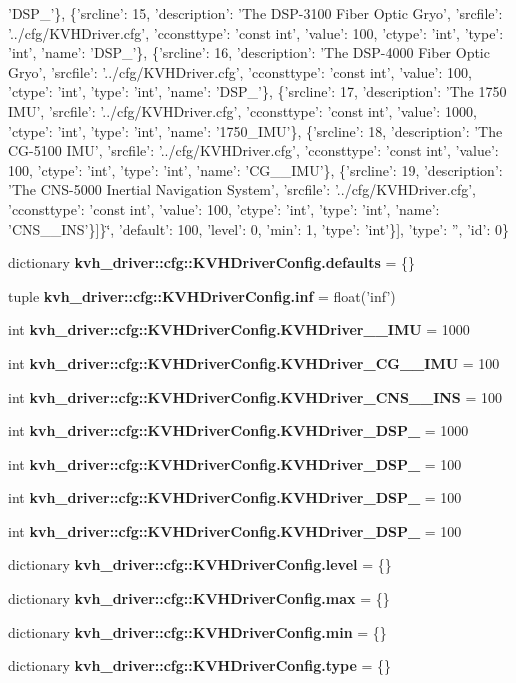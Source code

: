 \begin{DoxyCompactItemize}
'\-D\-S\-P\-\_'\}, \{'srcline'\-: 15, 'description'\-: '\-The \-D\-S\-P-\/3100 \-Fiber \-Optic \-Gryo', 'srcfile'\-: '../cfg/\-K\-V\-H\-Driver.\-cfg', 'cconsttype'\-: 'const int', 'value'\-: 100, 'ctype'\-: 'int', 'type'\-: 'int', 'name'\-: '\-D\-S\-P\-\_'\}, \{'srcline'\-: 16, 'description'\-: '\-The \-D\-S\-P-\/4000 \-Fiber \-Optic \-Gryo', 'srcfile'\-: '../cfg/\-K\-V\-H\-Driver.\-cfg', 'cconsttype'\-: 'const int', 'value'\-: 100, 'ctype'\-: 'int', 'type'\-: 'int', 'name'\-: '\-D\-S\-P\-\_'\}, \{'srcline'\-: 17, 'description'\-: '\-The 1750 \-I\-M\-U', 'srcfile'\-: '../cfg/\-K\-V\-H\-Driver.\-cfg', 'cconsttype'\-: 'const int', 'value'\-: 1000, 'ctype'\-: 'int', 'type'\-: 'int', 'name'\-: '1750\-\_\-\-I\-M\-U'\}, \{'srcline'\-: 18, 'description'\-: '\-The C\-G-\/5100 I\-M\-U', 'srcfile'\-: '../cfg/\-K\-V\-H\-Driver.\-cfg', 'cconsttype'\-: 'const int', 'value'\-: 100, 'ctype'\-: 'int', 'type'\-: 'int', 'name'\-: '\-C\-G\-\_\-\_\-\-I\-M\-U'\}, \{'srcline'\-: 19, 'description'\-: '\-The C\-N\-S-\/5000 Inertial Navigation System', 'srcfile'\-: '../cfg/\-K\-V\-H\-Driver.\-cfg', 'cconsttype'\-: 'const int', 'value'\-: 100, 'ctype'\-: 'int', 'type'\-: 'int', 'name'\-: '\-C\-N\-S\-\_\-\_\-\-I\-N\-S'\}]\}\char`\"{}, 'default'\-: 100, 'level'\-: 0, 'min'\-: 1, 'type'\-: 'int'\}], 'type'\-: '', 'id'\-: 0\}
\item 
dictionary {\bf kvh\-\_\-driver\-::cfg\-::\-K\-V\-H\-Driver\-Config.\-defaults} = \{\}
\item 
tuple {\bf kvh\-\_\-driver\-::cfg\-::\-K\-V\-H\-Driver\-Config.\-inf} = float('inf')
\item 
int {\bf kvh\-\_\-driver\-::cfg\-::\-K\-V\-H\-Driver\-Config.\-K\-V\-H\-Driver\-\_\-\_\-\-I\-M\-U} = 1000
\item 
int {\bf kvh\-\_\-driver\-::cfg\-::\-K\-V\-H\-Driver\-Config.\-K\-V\-H\-Driver\-\_\-\-C\-G\-\_\-\_\-\-I\-M\-U} = 100
\item 
int {\bf kvh\-\_\-driver\-::cfg\-::\-K\-V\-H\-Driver\-Config.\-K\-V\-H\-Driver\-\_\-\-C\-N\-S\-\_\-\_\-\-I\-N\-S} = 100
\item 
int {\bf kvh\-\_\-driver\-::cfg\-::\-K\-V\-H\-Driver\-Config.\-K\-V\-H\-Driver\-\_\-\-D\-S\-P\-\_} = 1000
\item 
int {\bf kvh\-\_\-driver\-::cfg\-::\-K\-V\-H\-Driver\-Config.\-K\-V\-H\-Driver\-\_\-\-D\-S\-P\-\_} = 100
\item 
int {\bf kvh\-\_\-driver\-::cfg\-::\-K\-V\-H\-Driver\-Config.\-K\-V\-H\-Driver\-\_\-\-D\-S\-P\-\_} = 100
\item 
int {\bf kvh\-\_\-driver\-::cfg\-::\-K\-V\-H\-Driver\-Config.\-K\-V\-H\-Driver\-\_\-\-D\-S\-P\-\_} = 100
\item 
dictionary {\bf kvh\-\_\-driver\-::cfg\-::\-K\-V\-H\-Driver\-Config.\-level} = \{\}
\item 
dictionary {\bf kvh\-\_\-driver\-::cfg\-::\-K\-V\-H\-Driver\-Config.\-max} = \{\}
\item 
dictionary {\bf kvh\-\_\-driver\-::cfg\-::\-K\-V\-H\-Driver\-Config.\-min} = \{\}
\item 
dictionary {\bf kvh\-\_\-driver\-::cfg\-::\-K\-V\-H\-Driver\-Config.\-type} = \{\}
\end{DoxyCompactItemize}

